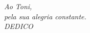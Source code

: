 \thispagestyle{empty}
\vspace*{18cm}

\begin{flushright}
  {\textit{Ao Toni,          \\ 
  pela sua alegria constante. \\
  \vspace{0.2 cm}
  DEDICO
  }}
\end{flushright} \normalsize